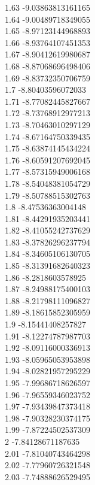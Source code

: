 {1.63	-9.03863813161165\\
1.64	-9.00489718349055\\
1.65	-8.97123144968893\\
1.66	-8.93764107451353\\
1.67	-8.90412619980687\\
1.68	-8.87068696498406\\
1.69	-8.83732350706759\\
1.7	-8.80403596072033\\
1.71	-8.77082445827667\\
1.72	-8.73768912977213\\
1.73	-8.70463010297129\\
1.74	-8.67164750339435\\
1.75	-8.63874145434224\\
1.76	-8.60591207692045\\
1.77	-8.57315949006168\\
1.78	-8.54048381054729\\
1.79	-8.50788515302763\\
1.8	-8.47536363004148\\
1.81	-8.44291935203441\\
1.82	-8.41055242737629\\
1.83	-8.37826296237794\\
1.84	-8.34605106130705\\
1.85	-8.31391682640323\\
1.86	-8.2818603578925\\
1.87	-8.24988175400103\\
1.88	-8.21798111096827\\
1.89	-8.18615852305959\\
1.9	-8.15441408257827\\
1.91	-8.12274787987703\\
1.92	-8.09116000336913\\
1.93	-8.05965053953898\\
1.94	-8.02821957295229\\
1.95	-7.99686718626597\\
1.96	-7.96559346023752\\
1.97	-7.93439847373418\\
1.98	-7.90328230374175\\
1.99	-7.87224502537309\\
2	-7.84128671187635\\
2.01	-7.81040743464298\\
2.02	-7.77960726321548\\
2.03	-7.74888626529495\\
}
